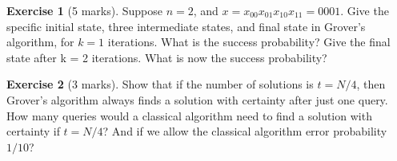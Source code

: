 \documentclass[12pt,oneside]{amsart}
\theoremstyle{plain}%
\theoremstyle{definition}
\newtheorem{exercise}{\color{cgblue}Exercise}[section]
\theoremstyle{remark}
\begin{document}
\begin{exercise}[5 marks]
  Suppose $n = 2$, and $x = x_{00}x_{01}x_{10}x_{11} = 0001$. Give the specific initial state, three intermediate states, and final state in Grover’s algorithm, for $k = 1$ iterations. What is the success probability? Give the final state after k = 2 iterations. What is now the success probability?
\end{exercise}

\begin{exercise}[3 marks]
  Show that if the number of solutions is $t = N/4$, then Grover’s algorithm always finds a solution with certainty after just one query. How many queries would a classical algorithm need to find a solution with certainty if $t = N/4$? And if we allow the classical algorithm error probability $1/10$?
\end{exercise}
\end{document}
